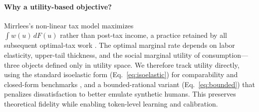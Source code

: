 \paragraph{Why a utility-based objective?}
Mirrlees’s non-linear tax model \citep{mirrlees1971exploration,mirrlees1976optimal} maximizes\\
$\int w(u)\,dF(u)$ rather than post-tax income, a practice retained by
all subsequent optimal-tax work \citep{diamond1971optimal,saez2001using,saez2016generalized}.
The optimal marginal rate depends on labor elasticity, upper-tail
thickness, and the social marginal utility of consumption—three objects
defined only in utility space.  We therefore track utility directly,
using the standard isoelastic form (Eq.~\ref{eq:isoelastic}) for
comparability and closed-form benchmarks \citep{mankiw2009optimal}, and a
bounded-rational variant (Eq.~\ref{eq:bounded}) that penalizes
dissatisfaction to better emulate synthetic humans.  This preserves
theoretical fidelity while enabling token-level learning and calibration.




